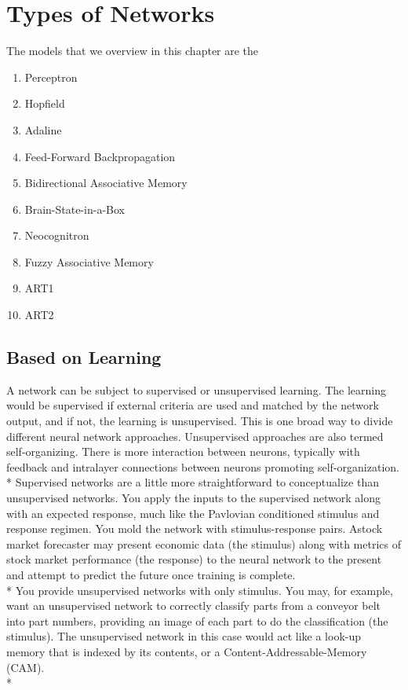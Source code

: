 \chapter{Types of Networks}


The models that we overview in this chapter are the \\

\begin{enumerate}
\item Perceptron
\item Hopfield
\item Adaline
\item Feed-Forward Backpropagation
\item Bidirectional Associative Memory
\item Brain-State-in-a-Box
\item Neocognitron
\item Fuzzy Associative Memory
\item ART1
\item ART2
\end{enumerate}


\section{Based on Learning}

A network can be subject to supervised or unsupervised learning. The learning would be supervised if external criteria are used and matched by the network output, and if not, the learning is unsupervised. This is one broad way to divide different neural network approaches. Unsupervised approaches are also termed self-organizing. There is more interaction between neurons, typically with feedback and intralayer connections between neurons promoting self-organization. \\*
Supervised networks are a little more straightforward to conceptualize than unsupervised networks. You apply the inputs to the supervised network along with an expected response, much like the Pavlovian conditioned stimulus and response regimen. You mold the network with stimulus-response pairs. Astock market forecaster may present economic data (the stimulus) along with metrics of stock market performance (the response) to the neural network to the present and attempt to predict the future once training is complete. \\*
You provide unsupervised networks with only stimulus. You may, for example, want an unsupervised network to correctly classify parts from a conveyor belt into part numbers, providing an image of each part to do the classification (the stimulus). The unsupervised network in this case would act like a look-up memory that is indexed by its contents, or a Content-Addressable-Memory (CAM). \\*

